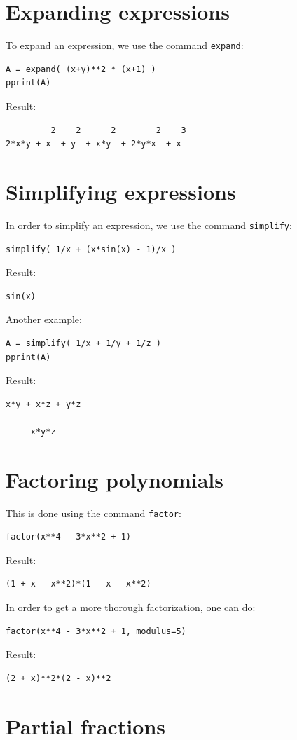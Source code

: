 \documentclass{article}
\begin{document}
\section{Expanding expressions}

To expand an expression, we use the command {\tt expand}:
\begin{verbatim}
A = expand( (x+y)**2 * (x+1) )
pprint(A)
\end{verbatim}
Result:
\begin{verbatim}
         2    2      2        2    3
2*x*y + x  + y  + x*y  + 2*y*x  + x 
\end{verbatim}

\section{Simplifying expressions}

In order to simplify an expression, we use the command {\tt simplify}:
\begin{verbatim}
simplify( 1/x + (x*sin(x) - 1)/x )
\end{verbatim}
Result:
\begin{verbatim}
sin(x)
\end{verbatim}
Another example:
\begin{verbatim}
A = simplify( 1/x + 1/y + 1/z )
pprint(A)
\end{verbatim}
Result:
\begin{verbatim}
x*y + x*z + y*z
---------------
     x*y*z     
\end{verbatim}

\section{Factoring polynomials}

This is done using the command {\tt factor}:
\begin{verbatim}
factor(x**4 - 3*x**2 + 1)
\end{verbatim}
Result:
\begin{verbatim}
(1 + x - x**2)*(1 - x - x**2)
\end{verbatim}
In order to get a more thorough factorization, one can do:
\begin{verbatim}
factor(x**4 - 3*x**2 + 1, modulus=5)
\end{verbatim}
Result:
\begin{verbatim}
(2 + x)**2*(2 - x)**2
\end{verbatim}

\section{Partial fractions}
\end{document}
